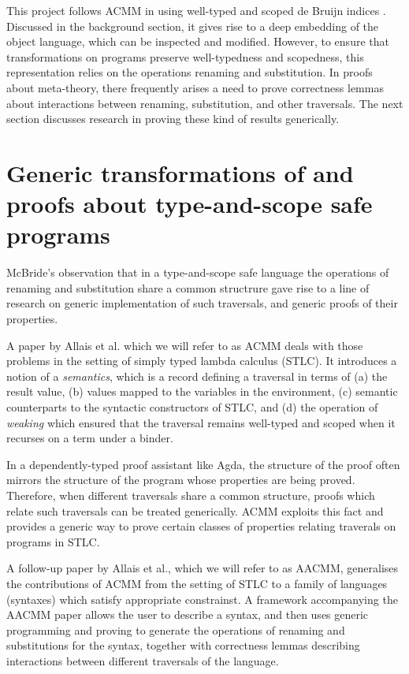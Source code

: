 \documentclass[bsc,frontabs,oneside,singlespacing,parskip,deptreport]{infthesis}
\theoremstyle{definition}
\theoremstyle{lemma}
\begin{document}
This project follows ACMM \cite{DBLP:conf/cpp/Allais0MM17} in using
well-typed and scoped de Bruijn indices
\cite{DBLP:conf/csl/AltenkirchR99}. Discussed in the background
section, it gives rise to a deep embedding of the object language,
which can be inspected and modified. However, to ensure that
transformations on programs preserve well-typedness and scopedness,
this representation relies on the operations renaming and
substitution. In proofs about meta-theory, there frequently arises a
need to prove correctness lemmas about interactions between renaming,
substitution, and other traversals. The next section discusses research
in proving these kind of results generically.

\section{Generic transformations of and proofs about type-and-scope
  safe programs}
\label{sec:gener-trav-proofs}

McBride's observation \cite{mcbride2005type} that in a type-and-scope
safe language the operations of renaming and substitution share a
common structrure gave rise to a line of research on generic
implementation of such traversals, and generic proofs of their
properties.

A paper by Allais et al. which we will refer to as ACMM
\cite{DBLP:conf/cpp/Allais0MM17} deals with those problems in the
setting of simply typed lambda calculus (STLC). It introduces a notion
of a \textit{semantics}, which is a record defining a traversal in
terms of (a) the result value, (b) values mapped to the variables in
the environment, (c) semantic counterparts to the syntactic
constructors of STLC, and (d) the operation of \textit{weaking} which
ensured that the traversal remains well-typed and scoped when it
recurses on a term under a binder.

In a dependently-typed proof assistant like Agda, the structure of the
proof often mirrors the structure of the program whose properties are
being proved. Therefore, when different traversals share a common
structure, proofs which relate such traversals can be treated
generically. ACMM exploits this fact and provides a generic way to
prove certain classes of properties relating traverals on programs in
STLC.

A follow-up paper by Allais et al., which we will refer to as AACMM,
generalises the contributions of ACMM from the setting of STLC to a
family of languages (syntaxes) which satisfy appropriate
constrainst. A framework accompanying the AACMM paper allows the user
to describe a syntax, and then uses generic programming and proving to
generate the operations of renaming and substitutions for the syntax,
together with correctness lemmas describing interactions between
different traversals of the language.
\end{document}
